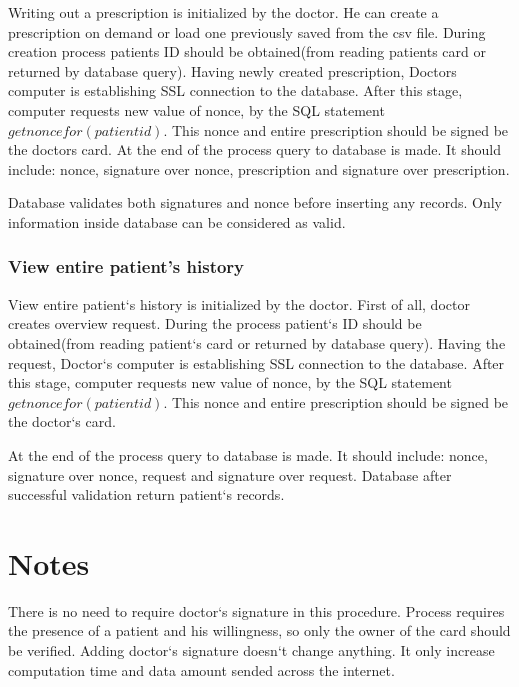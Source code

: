 

Writing out a prescription is initialized by the doctor. He can create a prescription on demand or load one previously saved from the csv file. During creation process patients ID should be obtained(from reading patients card or returned by database query). Having newly created prescription, Doctors computer is establishing SSL connection to the database. After this stage, computer requests new value of nonce, by the SQL statement  $getnoncefor(patientid)$.  This nonce and entire prescription should be signed be the doctors card. At the end of the process query to database is made. It should include: nonce, signature over nonce, prescription and signature over prescription.

Database validates both signatures and nonce before inserting any records. Only information inside database can be considered as valid.
\subsubsection{View entire patient's history}


View entire patient`s history is initialized by the doctor. First of all, doctor creates overview request. During the process patient`s ID should be obtained(from reading patient`s card or returned by database query). Having the request, Doctor`s computer is establishing SSL connection to the database. After this stage, computer requests new value of nonce, by the SQL statement  $getnoncefor(patientid)$.  This nonce and entire prescription should be signed be the doctor`s card.

At the end of the process query to database is made. It should include: nonce, signature over nonce, request and signature over request.  Database after successful  validation return patient`s records.
\section*{Notes}
There is no need to require doctor`s signature in this procedure. Process requires the presence of a patient and his willingness, so only the owner of the card should be verified. Adding doctor`s signature doesn`t change anything. It only increase computation time and data amount sended across the internet. 

